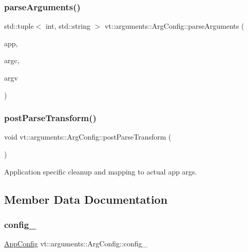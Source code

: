 \subsubsection{\texorpdfstring{parse\+Arguments()}{parseArguments()}}
{\footnotesize\ttfamily std\+::tuple$<$ int, std\+::string $>$ vt\+::arguments\+::\+Arg\+Config\+::parse\+Arguments (\begin{DoxyParamCaption}\item[{C\+L\+I\+::\+App \&}]{app,  }\item[{int \&}]{argc,  }\item[{char $\ast$$\ast$\&}]{argv }\end{DoxyParamCaption})}

\mbox{\label{structvt_1_1arguments_1_1_arg_config_a688dc6a1e88d8544e2ab41b4db15d8cd}} 
\subsubsection{\texorpdfstring{post\+Parse\+Transform()}{postParseTransform()}}
{\footnotesize\ttfamily void vt\+::arguments\+::\+Arg\+Config\+::post\+Parse\+Transform (\begin{DoxyParamCaption}{ }\end{DoxyParamCaption})\hspace{0.3cm}{\ttfamily [private]}}

Application specific cleanup and mapping to actual app args. 

\subsection{Member Data Documentation}
\mbox{\label{structvt_1_1arguments_1_1_arg_config_af30e0eae1ac1b29f7c85c25636109a9e}} 
\subsubsection{\texorpdfstring{config\+\_\+}{config\_}}
{\footnotesize\ttfamily \hyperlink{structvt_1_1arguments_1_1_app_config}{App\+Config} vt\+::arguments\+::\+Arg\+Config\+::config\+\_\+}

